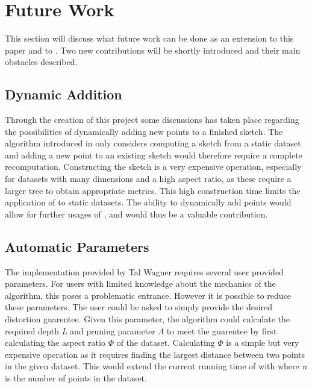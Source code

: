 \section{Future Work}
\label{futurework}
This section will discuss what future work can be done as an extension to this paper and to \cite{wagner17}. Two new contributions will be shortly introduced and their main obstacles described. 

\subsection{Dynamic Addition}
Through the creation of this project some discussions has taken place regarding the possibilities of dynamically adding new points to a finished sketch. The algorithm introduced in \cite{wagner17} only considers computing a sketch from a static dataset and adding a new point to an existing sketch would therefore require a complete recomputation. Constructing the sketch is a very expensive operation, especially for datasets with many dimensions and a high aspect ratio, as these require a larger tree to obtain appropriate metrics. This high construction time limits the application of \qs{} to static datasets. The ability to dynamically add points would allow for further usages of \qs{}, and would thus be a valuable contribution.  

\subsection{Automatic Parameters}
The implementation provided by Tal Wagner requires several user provided parameters. For users with limited knowledge about the mechanics of the algorithm, this poses a problematic entrance. However it is possible to reduce these parameters. The user could be asked to simply provide the desired distortion guarentee. Given this parameter, the algorithm could calculate the required depth \textit{L} and pruning parameter $\Lambda$ to meet the guarentee by first calculating the aspect ratio $\Phi$ of the dataset. Calculating $\Phi$ is a simple but very expensive operation as it requires finding the largest distance between two points in the given dataset. This would extend the current running time of \qs{} with  where \textit{n} is the number of points in the dataset. 